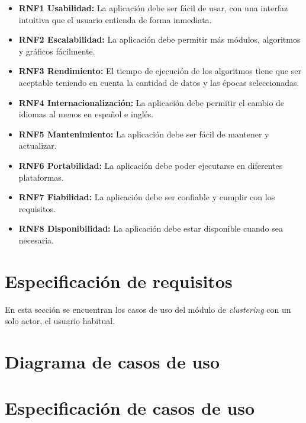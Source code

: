 \begin{itemize}
    \item \textbf{RNF1 Usabilidad:} La aplicación debe ser fácil de usar, con una interfaz intuitiva que el usuario entienda de forma inmediata.
    \item \textbf{RNF2 Escalabilidad:} La aplicación debe permitir más módulos, algoritmos y gráficos fácilmente.
    \item \textbf{RNF3 Rendimiento:} El tiempo de ejecución de los algoritmos tiene que ser aceptable teniendo en cuenta la cantidad de datos y las épocas seleccionadas.
    \item \textbf{RNF4 Internacionalización:} La aplicación debe permitir el cambio de idiomas al menos en español e inglés.
    \item \textbf{RNF5 Mantenimiento:} La aplicación debe ser fácil de mantener y actualizar.
    \item \textbf{RNF6 Portabilidad:} La aplicación debe poder ejecutarse en diferentes plataformas.
    \item \textbf{RNF7 Fiabilidad:} La aplicación debe ser confiable y cumplir con los requisitos.
    \item \textbf{RNF8 Disponibilidad:} La aplicación debe estar disponible cuando sea necesaria.
\end{itemize}

\section{Especificación de requisitos}

En esta sección se encuentran los casos de uso del módulo de \emph{clustering} con un solo actor, el usuario habitual.

\section{Diagrama de casos de uso}

    
\section{Especificación de casos de uso}


